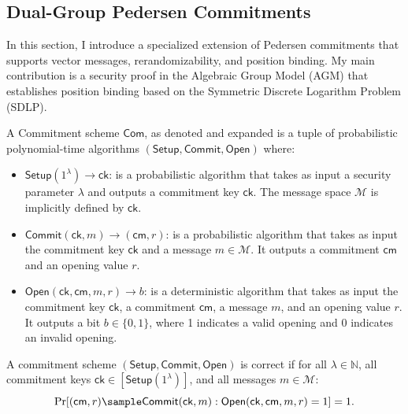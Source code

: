 \subsection{Dual-Group Pedersen Commitments}\label{sec:commitment}
In this section, I introduce a specialized extension of Pedersen commitments that supports vector messages, rerandomizability, and position binding. My main contribution is a security proof in the Algebraic Group Model (AGM) that establishes position binding based on the Symmetric Discrete Logarithm Problem (SDLP).


\begin{definition}\label{def:commitmentscheme}
A Commitment scheme $\mathsf{Com}$, as denoted \cite{feigenbaum_non-interactive_1992} and expanded \cite{goos_rapid_1997} is a tuple of probabilistic polynomial-time algorithms $(\mathsf{Setup}, \mathsf{Commit}, \mathsf{Open})$ where:
\begin{itemize}
    \item $\mathsf{Setup}(1^\lambda) \rightarrow \mathsf{ck}$: is a probabilistic algorithm that takes as input a security parameter $\lambda$ and outputs a commitment key $\mathsf{ck}$. The message space $\mathcal{M}$ is implicitly defined by $\mathsf{ck}$.
    
    \item $\mathsf{Commit}(\mathsf{ck}, m) \rightarrow (\mathsf{cm}, r)$: is a probabilistic algorithm that takes as input the commitment key $\mathsf{ck}$ and a message $m \in \mathcal{M}$. It outputs a commitment $\mathsf{cm}$ and an opening value $r$.
    
    \item $\mathsf{Open}(\mathsf{ck}, \mathsf{cm}, m, r) \rightarrow b$: is a deterministic algorithm that takes as input the commitment key $\mathsf{ck}$, a commitment $\mathsf{cm}$, a message $m$, and an opening value $r$. It outputs a bit $b \in \{0,1\}$, where 1 indicates a valid opening and 0 indicates an invalid opening.
\end{itemize}
\end{definition}

\begin{definition}[Correctness]
A commitment scheme $(\mathsf{Setup}, \mathsf{Commit}, \mathsf{Open})$ is correct if for all $\lambda \in \mathbb{N}$, all commitment keys $\mathsf{ck} \in [\mathsf{Setup}(1^\lambda)]$, and all messages $m \in \mathcal{M}$:
$$\Pr[(\mathsf{cm}, r) \sample \mathsf{Commit}(\mathsf{ck}, m) : \mathsf{Open}(\mathsf{ck}, \mathsf{cm}, m, r) = 1] = 1.$$
\end{definition}

